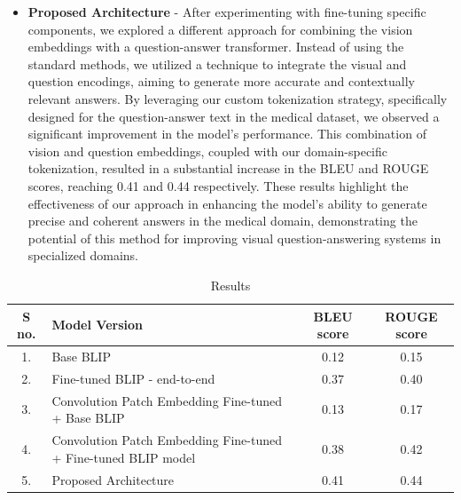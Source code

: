 \documentclass[pdflatex,sn-mathphys-num]{sn-jnl}%
\begin{document}
\begin{itemize}
\item \textbf{Proposed Architecture} - After experimenting with fine-tuning specific components, we explored a different approach for combining the vision embeddings with a question-answer transformer. Instead of using the standard methods, we utilized a technique to integrate the visual and question encodings, aiming to generate more accurate and contextually relevant answers. By leveraging our custom tokenization strategy, specifically designed for the question-answer text in the medical dataset, we observed a significant improvement in the model's performance. This combination of vision and question embeddings, coupled with our domain-specific tokenization, resulted in a substantial increase in the BLEU and ROUGE scores, reaching 0.41 and 0.44 respectively. These results highlight the effectiveness of our approach in enhancing the model's ability to generate precise and coherent answers in the medical domain, demonstrating the potential of this method for improving visual question-answering systems in specialized domains.
\end{itemize}

\begin{table}[h]
\centering
\label{tab:scores}
\begin{tabular}{|c|p{5cm}|c|c|}
\hline
\textbf{S no.} & \textbf{Model Version} & \textbf{BLEU score} & \textbf{ROUGE score} \\ \hline
1. & Base BLIP & 0.12 & 0.15 \\ \hline
2. & Fine-tuned BLIP - end-to-end & 0.37 & 0.40 \\ \hline
3. & Convolution Patch Embedding Fine-tuned + Base BLIP & 0.13 & 0.17 \\ \hline
4. & Convolution Patch Embedding Fine-tuned + Fine-tuned BLIP model & 0.38 & 0.42 \\ \hline
5. & Proposed Architecture & 0.41 & 0.44 \\ \hline
\end{tabular}
\caption{Results}
\end{table}
\end{document}
